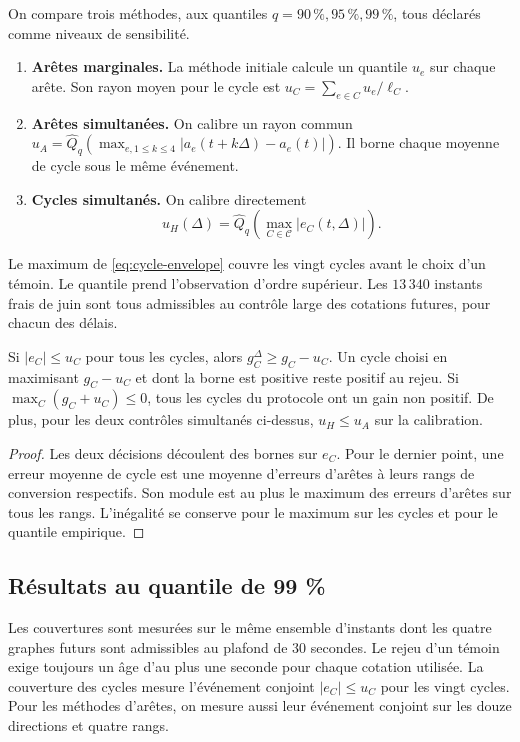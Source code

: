 On compare trois méthodes, aux quantiles \(q=90\,\%,95\,\%,99\,\%\), tous déclarés comme niveaux de sensibilité.
\begin{enumerate}
 \item \textbf{Arêtes marginales.} La méthode initiale calcule un quantile \(u_e\) sur chaque arête. Son rayon moyen pour le cycle est \(u_C=\sum_{e\in C}u_e/\ell_C\).
 \item \textbf{Arêtes simultanées.} On calibre un rayon commun \(u_A=\widehat Q_q(\max_{e,1\le k\le4}|a_e(t+k\Delta)-a_e(t)|)\). Il borne chaque moyenne de cycle sous le même événement.
 \item \textbf{Cycles simultanés.} On calibre directement
 \begin{equation}
  u_H(\Delta)=\widehat Q_q\!\left(\max_{C\in\mathcal C}|e_C(t,\Delta)|\right).
  \label{eq:cycle-envelope}
 \end{equation}
\end{enumerate}
Le maximum de \eqref{eq:cycle-envelope} couvre les vingt cycles avant le choix d'un témoin. Le quantile prend l'observation d'ordre supérieur. Les \(13\,340\) instants frais de juin sont tous admissibles au contrôle large des cotations futures, pour chacun des délais.

\begin{proposition}
Si \(|e_C|\le u_C\) pour tous les cycles, alors \(g_C^\Delta\ge g_C-u_C\). Un cycle choisi en maximisant \(g_C-u_C\) et dont la borne est positive reste positif au rejeu. Si \(\max_C(g_C+u_C)\le0\), tous les cycles du protocole ont un gain non positif. De plus, pour les deux contrôles simultanés ci-dessus, \(u_H\le u_A\) sur la calibration.
\end{proposition}
\begin{proof}
Les deux décisions découlent des bornes sur \(e_C\). Pour le dernier point, une erreur moyenne de cycle est une moyenne d'erreurs d'arêtes à leurs rangs de conversion respectifs. Son module est au plus le maximum des erreurs d'arêtes sur tous les rangs. L'inégalité se conserve pour le maximum sur les cycles et pour le quantile empirique.
\end{proof}

\clearpage
\subsection{Résultats au quantile de 99 \%}

Les couvertures sont mesurées sur le même ensemble d'instants dont les quatre graphes futurs sont admissibles au plafond de 30 secondes. Le rejeu d'un témoin exige toujours un âge d'au plus une seconde pour chaque cotation utilisée. La couverture des cycles mesure l'événement conjoint \(|e_C|\le u_C\) pour les vingt cycles. Pour les méthodes d'arêtes, on mesure aussi leur événement conjoint sur les douze directions et quatre rangs.

